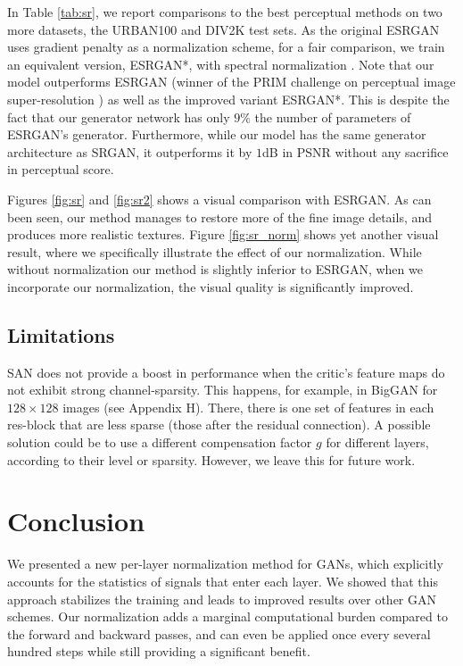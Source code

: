 \documentclass[letterpaper]{article} %
\begin{document}
In Table \ref{tab:sr}, we report comparisons to the best perceptual methods on two more datasets, the URBAN100 and DIV2K test sets. As the original ESRGAN \cite{esrgan} uses gradient penalty as a normalization scheme, for a fair comparison, we train an equivalent version, ESRGAN*, with spectral normalization \cite{spectral}. Note that our model outperforms ESRGAN (winner of the PRIM challenge on perceptual image super-resolution \cite{prim}) as well as the improved variant ESRGAN*. This is despite the fact that our generator network has only $9\%$ the number of parameters of ESRGAN's generator. Furthermore, while our model has the same generator architecture as SRGAN, it outperforms it by $1$dB in PSNR without any sacrifice in perceptual score.


Figures \ref{fig:sr} and \ref{fig:sr2} shows a visual comparison with ESRGAN. As can been seen, our method manages to restore more of the fine image details, and produces more realistic textures. Figure \ref{fig:sr_norm} shows yet another visual result, where we specifically illustrate the effect of our normalization. While without normalization our method is slightly inferior to ESRGAN, when we incorporate our normalization, the visual quality is significantly improved.


\subsection{Limitations}
SAN does not provide a boost in performance when the critic's feature maps do not exhibit strong channel-sparsity. This happens, for example, in BigGAN for $128\times128$ images (see Appendix H). There, there is one set of features in each res-block that are less sparse (those after the residual connection). A possible solution could be to use a different compensation factor $g$ for different layers, according to their level or sparsity. However, we leave this for future work.



\section{Conclusion}
We presented a new per-layer normalization method for GANs, which explicitly accounts for the statistics of signals that enter each layer. We showed that this approach stabilizes the training and leads to improved results over other GAN schemes. Our normalization adds a marginal computational burden compared to the forward and backward passes, and can even be applied once every several hundred steps while still providing a significant benefit.\\
\end{document}

